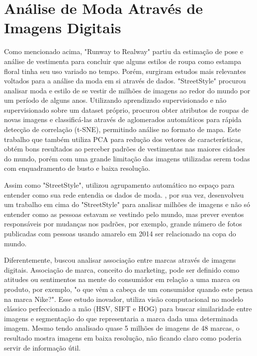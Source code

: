 \documentclass[12pt]{report}
\begin{document}
\section{Análise de Moda Através de Imagens Digitais}

 
Como mencionado acima, "Runway to Realway" \cite{runway2realway} partiu da estimação de pose e análise de vestimenta para concluir que alguns estilos de roupa como estampa floral tinha seu uso variado no tempo. Porém, surgiram estudos mais relevantes voltados para a análise da moda em si através de dados. "StreetStyle" \cite{streetstyle} procurou analisar moda e estilo de se vestir de milhões de imagens ao redor do mundo por um período de alguns anos. Utilizando aprendizado supervisionado e não supervisionado sobre um dataset próprio, procurou obter atributos de roupas de novas imagens e classificá-las através de aglomerados automáticos para rápida detecção de correlação (\ac{t-SNE}), permitindo análise no formato de mapa. Este trabalho que também utiliza \ac{PCA} para redução dos vetores de características, obtém bons resultados ao perceber padrões de vestimentas nas maiores cidades do mundo, porém com uma grande limitação das imagens utilizadas serem todas com enquadramento de busto e baixa resolução.

Assim como "StreetStyle", \cite{learningvisual} utilizou agrupamento automático no espaço para entender como sua rede entendia os dados de moda. \cite{geostyle}, por sua vez, desenvolveu um trabalho em cima do "StreetStyle" para analisar milhões de imagens e não só entender como as pessoas estavam se vestindo pelo mundo, mas prever eventos responsáveis por mudanças nos padrões, por exemplo, grande número de fotos publicadas com pessoas usando amarelo em 2014 ser relacionado na copa do mundo. 

Diferentemente, \cite{brands} buscou analisar associação entre marcas através de imagens digitais. Associação de marca, conceito do marketing, pode ser definido como atitudes ou sentimentos na mente do consumidor em relação a uma marca ou produto, por exemplo, "o que vêm a cabeça de um consumidor quando este pensa na marca Nike?". Esse estudo inovador, utiliza visão computacional no modelo clássico perfeccionado a mão (HSV, SIFT e HOG) para buscar similaridade entre imagens e segmentação do que representaria a marca dada uma determinada imagem. Mesmo tendo analisado quase 5 milhões de imagens de 48 marcas, o resultado mostra imagens em baixa resolução, não ficando claro como poderia servir de informação útil. 
\end{document}
